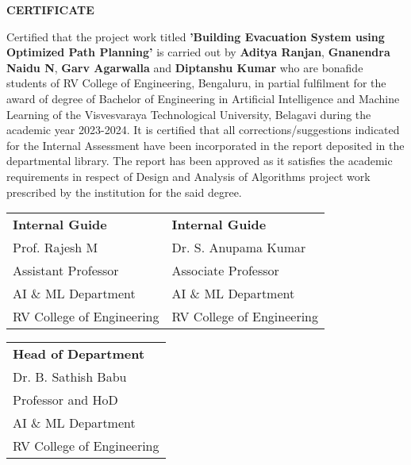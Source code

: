 \documentclass[11pt,a4paper]{report}
\begin{document}
% 

\newpage

\begin{center}
\vspace{0.5cm}
\textbf{\Large CERTIFICATE}
\end{center}

\vspace{0.5cm}

Certified that the project work titled \textbf{'Building Evacuation System using Optimized Path Planning'} is carried out by 
\textbf{Aditya Ranjan},
\textbf{Gnanendra Naidu N},
\textbf{Garv Agarwalla} and
\textbf{Diptanshu Kumar} who are bonafide students of RV College of Engineering, Bengaluru, in partial fulfilment for the award of degree of Bachelor of Engineering in Artificial Intelligence and Machine Learning of the Visvesvaraya Technological University, Belagavi during the academic year 2023-2024. It is certified that all corrections/suggestions indicated for the Internal Assessment have been incorporated in the report deposited in the departmental library. The report has been approved as it satisfies the academic requirements in respect of Design and Analysis of Algorithms project work prescribed by the institution for the said degree.

\vspace{2cm}


\begin{center}
\begin{tabular}{p{6cm}p{6cm}}
\textbf{Internal Guide} & \textbf{Internal Guide} \\
Prof. Rajesh M & Dr. S. Anupama Kumar \\
Assistant Professor & Associate Professor \\
AI \& ML Department & AI \& ML Department \\
RV College of Engineering & RV College of Engineering \\
\end{tabular}
\end{center}

\vspace{1cm}

\begin{center}
\begin{tabular}{p{6cm}}
\textbf{Head of Department} \\
Dr. B. Sathish Babu \\
Professor and HoD \\
AI \& ML Department \\
RV College of Engineering \\
\end{tabular}
\end{center}
\end{document}
